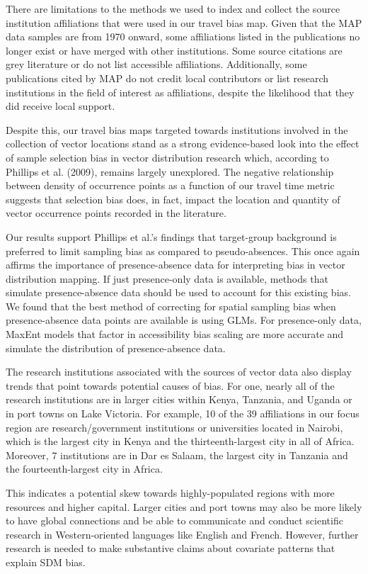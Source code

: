 \documentclass[sn-nature]{sn-jnl}%
\begin{document}
There are limitations to the methods we used to index and collect the source institution affiliations that were used in our travel bias map. Given that the MAP data samples are from 1970 onward, some affiliations listed in the publications no longer exist or have merged with other institutions. Some source citations are grey literature or do not list accessible affiliations. Additionally, some publications cited by MAP do not credit local contributors or list research institutions in the field of interest as affiliations, despite the likelihood that they did receive local support. 

Despite this, our travel bias maps targeted towards institutions involved in the collection of vector locations stand as a strong evidence-based look into the effect of sample selection bias in vector distribution research which, according to Phillips et al. (2009), remains largely unexplored. The negative relationship between density of occurrence points as a function of our travel time metric suggests that selection bias does, in fact, impact the location and quantity of vector occurrence points recorded in the literature. 

Our results support Phillips et al.’s findings that target-group background is preferred to limit sampling bias as compared to pseudo-absences. This once again affirms the importance of presence-absence data for interpreting bias in vector distribution mapping. If just presence-only data is available, methods that simulate presence-absence data should be used to account for this existing bias. We found that the best method of correcting for spatial sampling bias when presence-absence data points are available is using GLMs. For presence-only data, MaxEnt models that factor in accessibility bias scaling are more accurate and simulate the distribution of presence-absence data. 

The research institutions associated with the sources of vector data also display trends that point towards potential causes of bias. For one, nearly all of the research institutions are in larger cities within Kenya, Tanzania, and Uganda or in port towns on Lake Victoria. For example, 10 of the 39 affiliations in our focus region are research/government institutions or universities located in Nairobi, which is the largest city in Kenya and the thirteenth-largest city in all of Africa. Moreover, 7 institutions are in Dar es Salaam, the largest city in Tanzania and the fourteenth-largest city in Africa. 

This indicates a potential skew towards highly-populated regions with more resources and higher capital. Larger cities and port towns may also be more likely to have global connections and be able to communicate and conduct scientific research in Western-oriented languages like English and French. However, further research is needed to make substantive claims about covariate patterns that explain SDM bias. 
\end{document}
